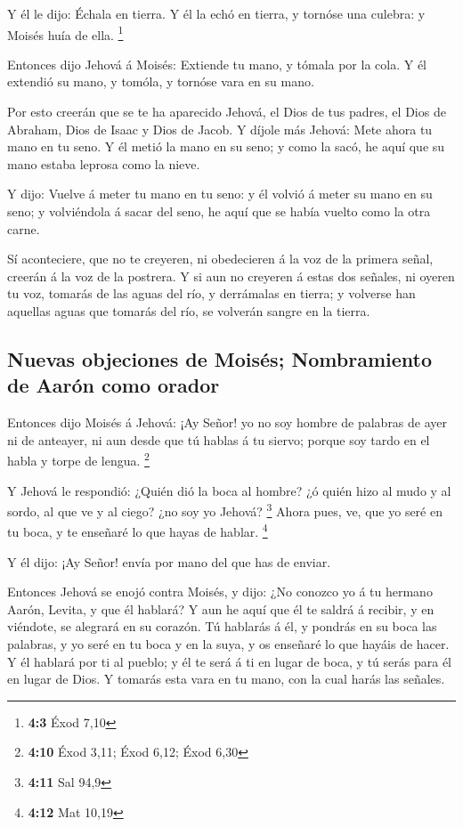  Y él le dijo: Échala en tierra. Y él la echó en tierra, y
tornóse una culebra: y Moisés huía de ella. \footnote{\textbf{4:3} Éxod
  7,10}

 Entonces dijo Jehová á Moisés: Extiende tu mano, y tómala
por la cola. Y él extendió su mano, y tomóla, y tornóse vara en su mano.

 Por esto creerán que se te ha aparecido Jehová, el Dios de
tus padres, el Dios de Abraham, Dios de Isaac y Dios de Jacob.
 Y díjole más Jehová: Mete ahora tu mano en tu seno. Y él
metió la mano en su seno; y como la sacó, he aquí que su mano estaba
leprosa como la nieve.

 Y dijo: Vuelve á meter tu mano en tu seno: y él volvió á
meter su mano en su seno; y volviéndola á sacar del seno, he aquí que se
había vuelto como la otra carne.

 Sí aconteciere, que no te creyeren, ni obedecieren á la voz
de la primera señal, creerán á la voz de la postrera.  Y si
aun no creyeren á estas dos señales, ni oyeren tu voz, tomarás de las
aguas del río, y derrámalas en tierra; y volverse han aquellas aguas que
tomarás del río, se volverán sangre en la tierra.

\hypertarget{nuevas-objeciones-de-moisuxe9s-nombramiento-de-aaruxf3n-como-orador}{%
\subsection{Nuevas objeciones de Moisés; Nombramiento de Aarón como
orador}\label{nuevas-objeciones-de-moisuxe9s-nombramiento-de-aaruxf3n-como-orador}}

 Entonces dijo Moisés á Jehová: ¡Ay Señor! yo no soy hombre
de palabras de ayer ni de anteayer, ni aun desde que tú hablas á tu
siervo; porque soy tardo en el habla y torpe de lengua. \footnote{\textbf{4:10}
  Éxod 3,11; Éxod 6,12; Éxod 6,30}

 Y Jehová le respondió: ¿Quién dió la boca al hombre? ¿ó
quién hizo al mudo y al sordo, al que ve y al ciego? ¿no soy yo Jehová?
\footnote{\textbf{4:11} Sal 94,9}  Ahora pues, ve, que yo
seré en tu boca, y te enseñaré lo que hayas de hablar. \footnote{\textbf{4:12}
  Mat 10,19}

 Y él dijo: ¡Ay Señor! envía por mano del que has de
enviar.

 Entonces Jehová se enojó contra Moisés, y dijo: ¿No
conozco yo á tu hermano Aarón, Levita, y que él hablará? Y aun he aquí
que él te saldrá á recibir, y en viéndote, se alegrará en su corazón.
 Tú hablarás á él, y pondrás en su boca las palabras, y yo
seré en tu boca y en la suya, y os enseñaré lo que hayáis de hacer.
 Y él hablará por ti al pueblo; y él te será á ti en lugar
de boca, y tú serás para él en lugar de Dios.  Y tomarás
esta vara en tu mano, con la cual harás las señales.

